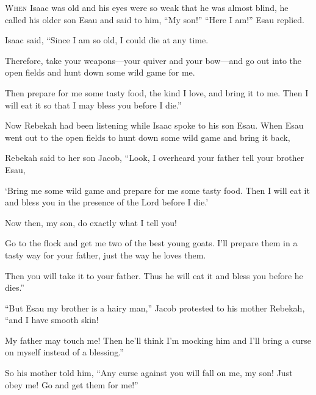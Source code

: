 \begin{scripture}
 \allowchapbreak\hypertarget{ch-genesis-27}{}\lettrine[lines=5]{\color{pentateuch}W}{\textsc{hen}} Isaac was old and his eyes were so weak that he was almost blind, he called his older son Esau and said to him, ``My son!'' ``Here I am!'' Esau replied.\everypar{}
 Isaac said, ``Since I am so old, I could die at any time.
 Therefore, take your weapons---your quiver and your bow---and go out into the open fields and hunt down some wild game for me.
 Then prepare for me some tasty food, the kind I love, and bring it to me. Then I will eat it so that I may bless you before I die.''
\everypar{}

 Now Rebekah had been listening while Isaac spoke to his son Esau. When Esau went out to the open fields to hunt down some wild game and bring it back,
 Rebekah said to her son Jacob, ``Look, I overheard your father tell your brother Esau,
 `Bring me some wild game and prepare for me some tasty food. Then I will eat it and bless you in the presence of the Lord before I die.'
 Now then, my son, do exactly what I tell you!
 Go to the flock and get me two of the best young goats. I'll prepare them in a tasty way for your father, just the way he loves them.
 Then you will take it to your father. Thus he will eat it and bless you before he dies.''
\everypar{}

 ``But Esau my brother is a hairy man,'' Jacob protested to his mother Rebekah, ``and I have smooth skin!
 My father may touch me! Then he'll think I'm mocking him and I'll bring a curse on myself instead of a blessing.''
 So his mother told him, ``Any curse against you will fall on me, my son! Just obey me! Go and get them for me!''
\everypar{}


\end{scripture}
